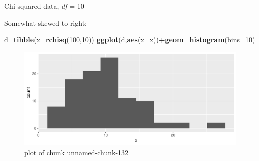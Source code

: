 \documentclass[
  ignorenonframetext,
]{beamer}
\newenvironment{Shaded}{\begin{snugshade}}{\end{snugshade}}
\newcommand{\DataTypeTok}[1]{\textcolor[rgb]{0.13,0.29,0.53}{#1}}
\newcommand{\DecValTok}[1]{\textcolor[rgb]{0.00,0.00,0.81}{#1}}
\newcommand{\KeywordTok}[1]{\textcolor[rgb]{0.13,0.29,0.53}{\textbf{#1}}}
\newcommand{\NormalTok}[1]{#1}
\newcommand{\OperatorTok}[1]{\textcolor[rgb]{0.81,0.36,0.00}{\textbf{#1}}}
\begin{document}
\begin{frame}[fragile]{Chi-squared data, \emph{df} = 10}
\protect\hypertarget{chi-squared-data-df-10}{}

Somewhat skewed to right:

\begin{Shaded}
\begin{Highlighting}[]
\NormalTok{d=}\KeywordTok{tibble}\NormalTok{(}\DataTypeTok{x=}\KeywordTok{rchisq}\NormalTok{(}\DecValTok{100}\NormalTok{,}\DecValTok{10}\NormalTok{))}
\KeywordTok{ggplot}\NormalTok{(d,}\KeywordTok{aes}\NormalTok{(}\DataTypeTok{x=}\NormalTok{x))}\OperatorTok{+}\KeywordTok{geom_histogram}\NormalTok{(}\DataTypeTok{bins=}\DecValTok{10}\NormalTok{)}
\end{Highlighting}
\end{Shaded}

\begin{figure}
\centering
\includegraphics{figure/unnamed-chunk-132-1.pdf}
\caption{plot of chunk unnamed-chunk-132}
\end{figure}

\end{frame}
\end{document}
